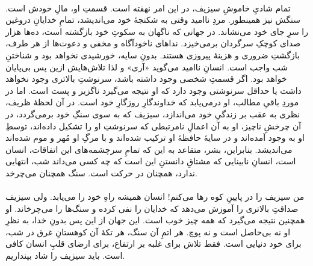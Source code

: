 \documentclass[12pt]{book}
\begin{document}
    \paragraph{}
    تمام شادیِ خاموشِ سیزیف، در این امر نهفته است. قسمتِ او، مالِ خودش است. سنگش نیز همینطور. مردِ ناامید وقتی به شکنجهٔ خود می‌اندیشد، تمامِ خدایانِ دروغین را سرِ جای خود می‌نشاند. در جهانی که ناگهان به سکوتِ خود بازگشته است، ده‌ها هزار صدای کوچکِ سرگردان برمی‌خیزد. نداهای ناخودآگاه و مخفی و دعوت‌ها از هر طرف، بازگشتِ ضروری و هزینهٔ پیروزی هستند. بدونِ سایه، خورشیدی نخواهد بود و شناختنِ شب واجب است. انسانِ ناامید می‌گوید «آری» و لذا تلاش‌هایش ازین پس بی‌پایان خواهد بود. اگر قسمتِ شخصی وجود داشته باشد، سرنوشتِ بالاتری وجود نخواهد داشت یا حداقل سرنوشتی وجود دارد که او نتیجه می‌گیرد ناگزیر و پست است. اما در موردِ باقیِ مطالب، او درمی‌یابد که خداوندگارِ روزگارِ خود است. در آن لحظهٔ ظریف، نظری به عقب بر زندگیِ خود می‌اندازد، سیزیف که به سوی سنگِ خود برمی‌گردد، در آن چرخشِ ناچیز، او به آن اعمالِ نامرتبطی که سرنوشتِ او را تشکیل داده‌اند، توسطِ او به وجود آمده‌اند و در سایهٔ حافظهٔ او ترکیب شده‌اند و با مرگِ او مُهر و موم شده‌اند می‌اندیشد. بنابراین، بشر، متقاعد به این که تمامِ سرچشمه‌های این اتفاقات، انسان است، انسانِ نابینایی که مشتاقِ دانستنِ این است که چه کسی می‌داند شب، انتهایی ندارد، همچنان در حرکت است. سنگ همچنان می‌چرخد.
    
    \paragraph{}
    من سیزیف را در پایینِ کوه رها می‌کنم! انسان همیشه راهِ خود را می‌یابد. ولی سیزیف صداقتِ بالاتری را آموزش می‌دهد که خدایان را نفی کرده و سنگ‌ها را می‌چرخاند. او همچنین نتیجه می‌گیرد که همه چیز خوب است. این جهان از این پس بدونِ خدا، به نظرِ او نه بی‌حاصل است و نه پوچ. هر اتمِ آن سنگ، هر تکهٔ آن کوهستانِ غرق در شب، برای خود دنیایی است. فقط تلاش برای غلبه بر ارتفاع، برای ارضای قلبِ انسان کافی است. باید سیزیف را شاد بپنداریم.
\end{document}
